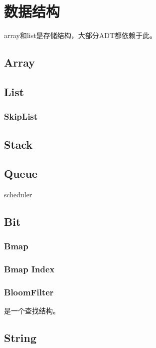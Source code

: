 \chapter{数据结构}

array和list是存储结构，大部分ADT都依赖于此。

\section{Array}

\section{List}

\subsection{SkipList}

\section{Stack}

\section{Queue}

scheduler

\section{Bit}

\subsection{Bmap}

\subsection{Bmap Index}

\subsection{BloomFilter}

是一个查找结构。

\section{String}

